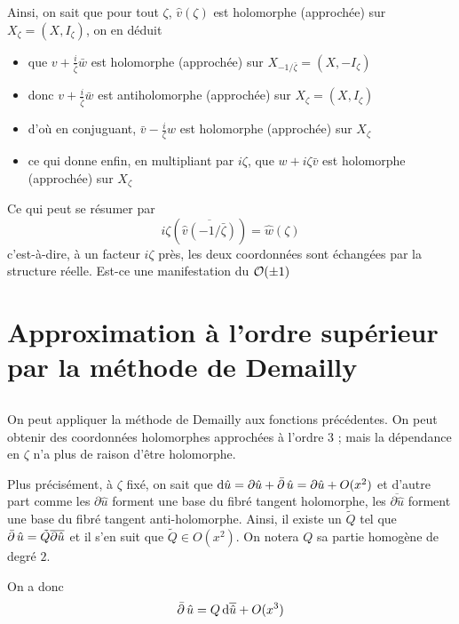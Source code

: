 \documentclass[11pt,draft,twocolumn,makeidx]{amsart}
\numberwithin{equation}{subsection}
\begin{document}
Ainsi, on sait que pour tout $\zeta$, $\hat{v}(\zeta)$ est holomorphe (approchée) sur $X_\zeta = (X,I_\zeta)$, on en déduit
\begin{itemize}
\item que $v + \frac{i}{\bar\zeta}\bar{w}$  est holomorphe (approchée) sur   $X_{-1/\bar\zeta} = (X,-I_\zeta)$
\item donc $v + \frac{i}{\bar\zeta}\bar{w}$  est antiholomorphe (approchée) sur   $X_\zeta = (X,I_\zeta)$
\item d'où en conjuguant, $\bar{v} -  \frac{i}{\zeta}w$ est holomorphe (approchée) sur  $X_\zeta$
\item ce qui donne enfin, en multipliant par $i\zeta$, que $w + i\zeta \bar{v}$  est holomorphe (approchée) sur  $X_\zeta$   
\end{itemize}
Ce qui peut se résumer par
\begin{equation}
i\zeta\left(\overline{\hat{v}\left(-1/\bar{\zeta} \right)}\right) = \hat{w}(\zeta)
\end{equation}
c'est-à-dire, à un facteur $i\zeta$ près, les deux coordonnées sont échangées par la structure réelle. Est-ce une manifestation du $\mathcal{O}(\pm 1 )$ \?

\section{Approximation à l'ordre supérieur par la méthode de Demailly}
\subsection{} On peut appliquer la méthode de Demailly \cite{Demailly} aux fonctions précédentes. On peut obtenir des coordonnées holomorphes approchées à l'ordre $3$ ; mais la dépendance en $\zeta$ n'a plus de raison d'être holomorphe. 

Plus précisément, à $\zeta$ fixé, on sait que $\operatorname{d\!} \hat{u} = \partial \hat{u} + \operatorname{\bar{\partial}} \hat{u} = \partial \hat{u} + O(x^2)$ et d'autre part comme les $\partial \hat{u}$ forment une base du fibré tangent holomorphe, les $\overline{\partial \hat{u}}$ forment une base du fibré tangent anti-holomorphe. Ainsi, il existe un $\tilde{Q}$ tel que $\operatorname{\bar{\partial}} \hat{u} = \tilde{Q} \overline{\partial \hat{u}}$ et il s'en suit que $\tilde{Q} \in O(x^2)$. On notera $Q$ sa partie homogène de degré $2$.

On a donc
\begin{equation}\label{Q}
\operatorname{\bar{\partial}} \hat{u} = Q \operatorname{d\!} \overline{\hat{u}} + O(x^3)
\end{equation}
\end{document}
